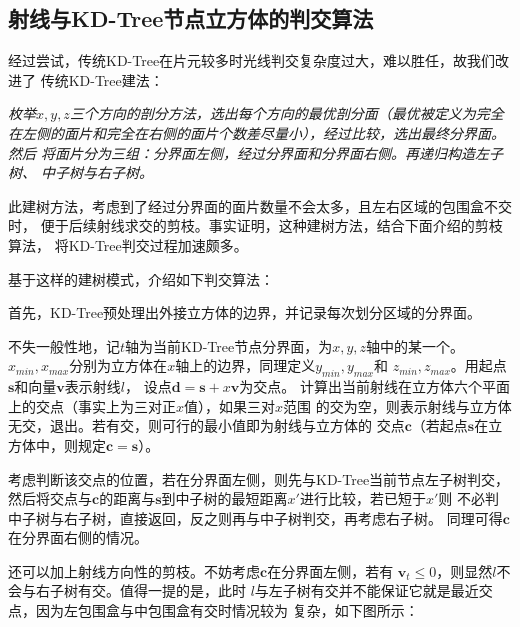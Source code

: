 \documentclass[a4paper,12pt]{article}
\theoremstyle{plain}
\numberwithin{thmdef}{section}
\begin{document}
\subsection{射线与KD-Tree节点立方体的判交算法}
经过尝试，传统KD-Tree在片元较多时光线判交复杂度过大，难以胜任，故我们改进了%
传统KD-Tree建法：\par
\textit{%
枚举$x,y,z$三个方向的剖分方法，选出每个方向的最优剖分面（最优被定义为完全%
在左侧的面片和完全在右侧的面片个数差尽量小），经过比较，选出最终分界面。然后%
将面片分为三组：分界面左侧，经过分界面和分界面右侧。再递归构造左子树、%
中子树与右子树。}\par
此建树方法，考虑到了经过分界面的面片数量不会太多，且左右区域的包围盒不交时，%
便于后续射线求交的剪枝。事实证明，这种建树方法，结合下面介绍的剪枝算法，%
将KD-Tree判交过程加速颇多。\par
基于这样的建树模式，介绍如下判交算法：\par
首先，KD-Tree预处理出外接立方体的边界，并记录每次划分区域的分界面。\par
不失一般性地，记$t$轴为当前KD-Tree节点分界面，为$x,y,z$轴中的某一个。%
$x_{min},x_{max}$分别为立方体在$x$轴上的边界，同理定义$y_{min},y_{max}$和%
$z_{min},z_{max}$。用起点$\mathbf{s}$和向量$\mathbf{v}$表示射线$l$，%
设点$\mathbf{d}=\mathbf{s}+x\mathbf{v}$为交点。%
计算出当前射线在立方体六个平面上的交点（事实上为三对正$x$值），如果三对$x$范围%
的交为空，则表示射线与立方体无交，退出。若有交，则可行的最小值即为射线与立方体的%
交点$\mathbf{c}$（若起点$\mathbf{s}$在立方体中，则规定$\mathbf{c}=\mathbf{s}$）。\par
考虑判断该交点的位置，若在分界面左侧，则先与KD-Tree当前节点左子树判交，%
然后将交点与$\mathbf{c}$的距离与$\mathbf{s}$到中子树的最短距离$x'$进行比较，若已短于$x'$则%
不必判中子树与右子树，直接返回，反之则再与中子树判交，再考虑右子树。%
同理可得$\mathbf{c}$在分界面右侧的情况。\par
还可以加上射线方向性的剪枝。不妨考虑$\mathbf{c}$在分界面左侧，若有%
$\mathbf{v}_t\leqslant 0$，则显然$l$不会与右子树有交。值得一提的是，此时%
$l$与左子树有交并不能保证它就是最近交点，因为左包围盒与中包围盒有交时情况较为%
复杂，如下图所示：
\end{document}
